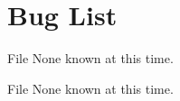 \chapter{Bug List}
\hypertarget{bug}{}\label{bug}

\begin{DoxyRefList}
\item[File \doxylink{distancevector_8cpp}{distancevector.cpp} ]\label{bug__bug000001}%
%
None known at this time.  
\item[File \doxylink{linkstate_8cpp}{linkstate.cpp} ]\label{bug__bug000002}%
%
None known at this time. 
\end{DoxyRefList}